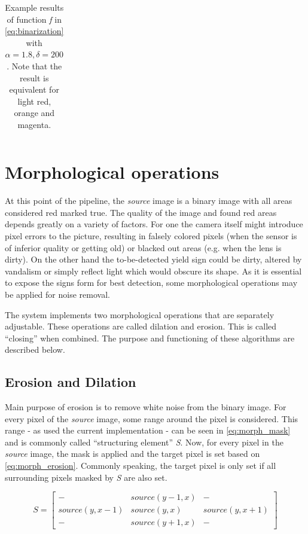 \documentclass{report}
\begin{document}
\begin{table}
\begin{tabular}{c r r r r r}
  \end{tabular}
  \caption{Example results of function \textit{f} in
    \ref{eq:binarization} with \( \alpha=1.8, \delta=200 \). Note that
    the result is equivalent for light red, orange and magenta.}
  \label{table:binarization}
\end{table}

{}


\section{Morphological operations}
\label{sec:morph}

At this point of the pipeline, the \textit{source} image is a binary
image with all areas considered red marked true. The quality of the
image and found red areas depends greatly on a variety of factors. For
one the camera itself might introduce pixel errors to the picture,
resulting in falsely colored pixels (when the sensor is of inferior
quality or getting old) or blacked out areas (e.g. when the lens is
dirty). On the other hand the to-be-detected yield sign could be
dirty, altered by vandalism or simply reflect light which would
obscure its shape. As it is essential to expose the signs form for
best detection, some morphological operations may be applied for noise
removal.

The system implements two morphological operations that are separately
adjustable. These operations are called dilation and erosion. This is
called ``closing'' when combined. The purpose and functioning of these
algorithms are described below.


\subsection{Erosion and Dilation}

Main purpose of erosion is to remove white noise from the binary
image. For every pixel of the \textit{source} image, some range around
the pixel is considered. This range - as used the current
implementation - can be seen in \ref{eq:morph_mask} and is commonly
called ``structuring element'' \textit{S}. Now, for every pixel in the
\textit{source} image, the mask is applied and the target pixel is set
based on \ref{eq:morph_erosion}. Commonly speaking, the target pixel
is only set if all surrounding pixels masked by \textit{S} are also
set.

\begin{equation}\label{eq:morph_mask}
  S = \begin{bmatrix}

    -              & source(y-1, x) & -              \\
    source(y, x-1) & source(y, x)   & source(y, x+1) \\
    -              & source(y+1, x) & -

  \end{bmatrix}
\end{equation}
\end{document}
